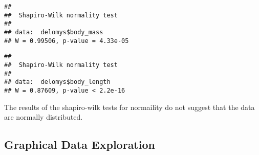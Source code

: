 \documentclass[
]{article}
\newenvironment{Shaded}{\begin{snugshade}}{\end{snugshade}}
\newcommand{\FunctionTok}[1]{\textcolor[rgb]{0.00,0.00,0.00}{#1}}
\newcommand{\NormalTok}[1]{#1}
\newcommand{\SpecialCharTok}[1]{\textcolor[rgb]{0.00,0.00,0.00}{#1}}
\begin{document}
\begin{verbatim}
## 
##  Shapiro-Wilk normality test
## 
## data:  delomys$body_mass
## W = 0.99506, p-value = 4.33e-05
\end{verbatim}

\begin{Shaded}
\end{Shaded}

\begin{verbatim}
## 
##  Shapiro-Wilk normality test
## 
## data:  delomys$body_length
## W = 0.87609, p-value < 2.2e-16
\end{verbatim}

The results of the shapiro-wilk tests for normaility do not suggest that
the data are normally distributed.

\hypertarget{graphical-data-exploration}{%
\subsection{Graphical Data
Exploration}\label{graphical-data-exploration}}
\end{document}
